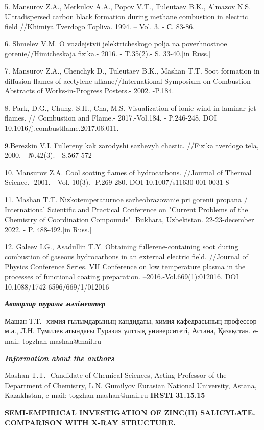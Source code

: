 5. Mansurov Z.A., Merkulov A.A., Popov V.T., Tuleutaev B.K., Almazov
N.S. Ultradispersed carbon black formation during methane combustion in
electric field //Khimiya Tverdogo Topliva. 1994. -- Vol. 3. - С. 83-86.

6. Shmelev V.M. O vozdejstvii jelektricheskogo polja na poverhnostnoe
gorenie//Himicheskaja fizika.- 2016. - T.35(2).- S. 33-40.{[}in Russ.{]}

7. Mansurov Z.A., Chenchyk D., Tuleutaev B.K., Mashan T.T. Soot
formation in diffusion flames of acetylene-alkane//International
Symposium on Combustion Abstracts of Works-in-Progress Posters.- 2002.
-P.184.

8. Park, D.G., Chung, S.H., Cha, M.S. Visualization of ionic wind in
laminar jet flames. // Combustion and Flame.- 2017.-Vol.184. -
Р.246-248. DOI 10.1016/j.combustflame.2017.06.011.

9.Berezkin V.I. Fullereny kak zarodyshi sazhevyh chastic. //Fizika
tverdogo tela, 2000. - №.42(3). - S.567-572

10. Mansurov Z.A. Cool sooting flames of hydrocarbons. //Journal of
Thermal Science.- 2001. - Vol. 10(3). -P.269-280. DOI
10.1007/s11630-001-0031-8

11. Mashan T.T. Nizkotemperaturnoe sazheobrazovanie pri gorenii propana
/ International Scientific and Practical Conference on "Current Problems
of the Chemistry of Coordination Compounds". Bukhara, Uzbekistan.
22-23-december 2022. - P. 488-492.{[}in Russ.{]}

12. Galeev I.G., Asadullin T.Y. Obtaining fullerene-containing soot
during combustion of gaseous hydrocarbons in an external electric field.
//Journal of Physics Conference Series. VII Conference on low
temperature plasma in the processes of functional coating preparation.
--2016.-Vol.669(1):012016. DOI 10.1088/1742-6596/669/1/012016

\emph{{\bfseries Авторлар туралы мәліметтер}}

Машан Т.Т.- химия ғылымдарының кандидаты, химия кафедрасының профессор
м.а., Л.Н. Гумилев атындағы Еуразия ұлттық университеті, Астана,
Қазақстан, e-mail: togzhan-mashan@mail.ru

\emph{{\bfseries Information about the authors}}

Mashan T.T.- Candidate of Chemical Sciences, Acting Professor of the
Department of Chemistry, L.N. Gumilyov Eurasian National University,
Astana, Kazakhstan, e-mail: togzhan-mashan@mail.ru\newpage
{\bfseries IRSTI 31.15.15}

{\bfseries SEMI-EMPIRICAL INVESTIGATION OF ZINC(II) SALICYLATE. COMPARISON
WITH X-RAY STRUCTURE.}

